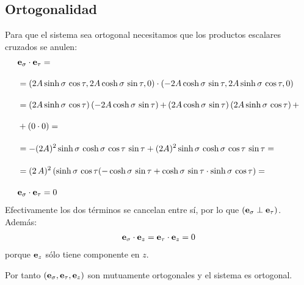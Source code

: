 \documentclass[12pt]{article}
\begin{document}
\subsection*{Ortogonalidad}
Para que el sistema sea ortogonal necesitamos que los productos escalares cruzados se anulen:
\begin{align*}
&\vb{e}_{\sigma} \cdot \vb{e}_{\tau} = \\[1em]
&= \left( 2 A \sinh \sigma \, \cos \tau, 2 A \cosh \sigma \, \sin \tau, 0 \right) \cdot \left( - 2 A \cosh \sigma \, \sin \tau, 2 A \sinh \sigma \, \cos \tau, 0 \right) \\[1em]
&= \left( 2 A \sinh \sigma \, \cos \tau \right) \left( - 2 A \cosh \sigma \, \sin \tau \right) {+} \left( 2 A \cosh \sigma \, \sin \tau \right) \left( 2 A \sinh \sigma \, \cos \tau \right) + \\[1em]
&+ \left( 0 \cdot 0 \right) = \\[1em]
&= - (2 A)^{2} \sinh \sigma \, \cosh \sigma \, \cos \tau \, \sin \tau + (2 A)^{2} \sinh \sigma \, \cosh \sigma \, \cos \tau \, \sin \tau = \\[1em]
&= (2 \, A)^{2} \left( \sinh \sigma \, \cos \tau (- \cosh \sigma \, \sin \tau + \cosh \sigma \, \sin \tau \cdot \sinh \sigma \, \cos \tau \right) = \\[1em]
&\vb{e}_{\sigma} \cdot \vb{e}_{\tau} = 0
\end{align*}
Efectivamente los dos términos se cancelan entre sí, por lo que $( \vb{e}_{\sigma} \perp \vb{e}_{\tau} )$. Además:
\begin{align*}
\vb{e}_{\sigma} \cdot \vb{e}_{z} =\vb{e}_{\tau} \cdot \vb{e}_{z} = 0
\end{align*}
porque $\vb{e}_{z}$ sólo tiene componente en $z$.
\par
Por tanto $(\vb{e}_{\sigma}, \vb{e}_{\tau}, \vb{e}_{z})$ son mutuamente ortogonales y el sistema es ortogonal.
\end{document}
